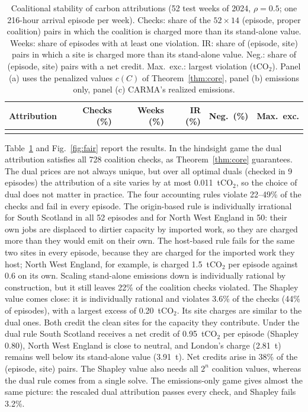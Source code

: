 \begin{table}[!htbp]
\centering
\caption{Coalitional stability of carbon attributions (52 test weeks of 2024, $\rho=0.5$; one 216-hour arrival episode per week). Checks: share of the $52\times14$ (episode, proper coalition) pairs in which the coalition is charged more than its stand-alone value. Weeks: share of episodes with at least one violation. IR: share of (episode, site) pairs in which a site is charged more than its stand-alone value. Neg.: share of (episode, site) pairs with a net credit. Max.\ exc.: largest violation (tCO$_2$). Panel (a) uses the penalized values $c(C)$ of Theorem~\ref{thm:core}, panel (b) emissions only, panel (c) CARMA's realized emissions.}
\label{tab:fair}
\footnotesize\setlength{\tabcolsep}{4pt}
\begin{tabular}{lrrrrr}
\toprule
Attribution & Checks (\%) & Weeks (\%) & IR (\%) & Neg.\ (\%) & Max.\ exc. \\
\midrule
{}{../results/table_fair.tex}
\bottomrule
\end{tabular}
\end{table}

Table~\ref{tab:fair} and Fig.~\ref{fig:fair} report the results. In the hindsight game the dual attribution satisfies all 728 coalition checks, as Theorem~\ref{thm:core} guarantees. The dual prices are not always unique, but over all optimal duals (checked in 9 episodes) the attribution of a site varies by at most 0.011~tCO$_2$, so the choice of dual does not matter in practice. The four accounting rules violate 22--49\% of the checks and fail in every episode. The origin-based rule is individually irrational for South Scotland in all 52 episodes and for North West England in 50: their own jobs are displaced to dirtier capacity by imported work, so they are charged more than they would emit on their own. The host-based rule fails for the same two sites in every episode, because they are charged for the imported work they host; North West England, for example, is charged 1.5~tCO$_2$ per episode against 0.6 on its own. Scaling stand-alone emissions down is individually rational by construction, but it still leaves 22\% of the coalition checks violated. The Shapley value comes close: it is individually rational and violates 3.6\% of the checks (44\% of episodes), with a largest excess of 0.20~tCO$_2$. Its site charges are similar to the dual ones. Both credit the clean sites for the capacity they contribute. Under the dual rule South Scotland receives a net credit of 0.95~tCO$_2$ per episode (Shapley 0.80), North West England is close to neutral, and London's charge (2.81~t) remains well below its stand-alone value (3.91~t). Net credits arise in 38\% of the (episode, site) pairs. The Shapley value also needs all $2^n$ coalition values, whereas the dual rule comes from a single solve. The emissions-only game gives almost the same picture: the rescaled dual attribution passes every check, and Shapley fails 3.2\%.

